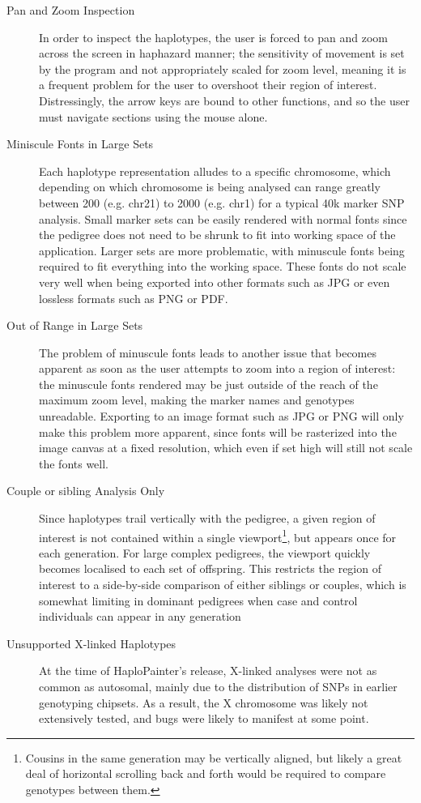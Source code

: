 \begin{description}
\item[Pan and Zoom Inspection]{In order to inspect the haplotypes, the user is forced to pan and zoom across the screen in haphazard manner; the sensitivity of movement is set by the program and not appropriately scaled for zoom level, meaning it is a frequent problem for the user to overshoot their region of interest. Distressingly, the arrow keys are bound to other functions, and so the user must navigate sections using the mouse alone.}
\item[Miniscule Fonts in Large Sets]{Each haplotype representation alludes to a specific chromosome, which depending on which chromosome is being analysed can range greatly between 200 (e.g. chr21) to 2000 (e.g. chr1) for a typical 40k marker SNP analysis. Small marker sets can be easily rendered with normal fonts since the pedigree does not need to be shrunk to fit into working space of the application. Larger sets are more problematic, with minuscule fonts being required to fit everything into the working space. These fonts do not scale very well when being exported into other formats such as JPG or even lossless formats such as PNG or PDF.}
\item[Out of Range in Large Sets]{The problem of minuscule fonts leads to another issue that becomes apparent as soon as the user attempts to zoom into a region of interest: the minuscule fonts rendered may be just outside of the reach of the maximum zoom level, making the marker names and genotypes unreadable. Exporting to an image format such as JPG or PNG will only make this problem more apparent, since fonts will be rasterized into the image canvas  at a fixed resolution, which even if set high will still not scale the fonts well.}
\item[Couple or sibling Analysis Only]{Since haplotypes trail vertically with the pedigree, a given region of interest is not contained within a single viewport\footnote{Cousins in the same generation may be vertically aligned, but likely a great deal of horizontal scrolling back and forth would be required to compare genotypes between them.}, but appears once for each generation. For large complex pedigrees, the viewport quickly becomes localised to each set of offspring. This restricts the region of interest to a side-by-side comparison of either siblings or couples, which is somewhat limiting in dominant pedigrees when case and control individuals can appear in any generation}
\item[Unsupported X-linked Haplotypes]{At the time of HaploPainter's release, X-linked analyses were not as common as autosomal, mainly due to the distribution of SNPs in earlier genotyping chipsets. As a result, the X chromosome was likely not extensively tested, and bugs were likely to manifest at some point.}
\end{description}

